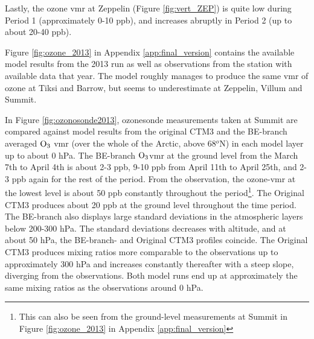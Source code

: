 Lastly, the ozone \acrshort{vmr} at Zeppelin (Figure \ref{fig:vert_ZEP}) is quite low during Period 1 (approximately 0-10 ppb), and increases abruptly in Period 2 (up to about 20-40 ppb). 







\medskip

Figure \ref{fig:ozone_2013} in Appendix \ref{app:final_version} contains the available model results from the 2013 run as well as observations from the station with available data that year. The model roughly manages to produce the same \acrshort{vmr} of ozone at Tiksi and Barrow, but seems to underestimate at Zeppelin, Villum and Summit. 


\medskip

In Figure \ref{fig:ozonosonde2013}, ozonesonde measurements taken at Summit are compared against model results from the original CTM3 and the BE-branch averaged $\mathrm{O_3}$ \acrshort{vmr} (over the whole of the Arctic, above 68$^o$N) in each model layer up to about 0 hPa. The BE-branch $\mathrm{O_3}$\acrshort{vmr} at the ground level from the March 7th to April 4th is about 2-3 ppb, 9-10 ppb from April 11th to April 25th, and 2-3 ppb again for the rest of the period. From the observation, the ozone-\acrshort{vmr} at the lowest level is about 50 ppb constantly throughout the period\footnote{This can also be seen from the ground-level measurements at Summit in Figure \ref{fig:ozone_2013} in Appendix \ref{app:final_version}}. The Original CTM3 produces about 20 ppb at the ground level throughout the time period. The BE-branch also displays large standard deviations in the atmospheric layers below 200-300 hPa. The standard deviations decreases with altitude, and at about 50 hPa, the BE-branch- and Original CTM3 profiles coincide. The Original CTM3 produces mixing ratios more comparable to the observations up to approximately 300 hPa and increases constantly thereafter with a steep slope, diverging from the observations. Both model runs end up at approximately the same mixing ratios as the observations around 0 hPa.  




\clearpage




